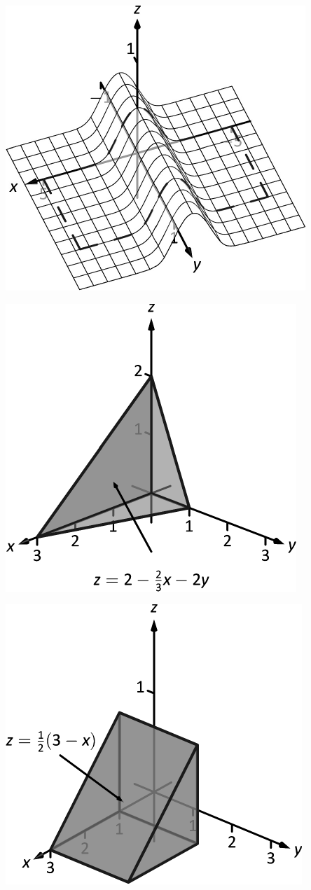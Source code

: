 \documentclass[10pt]{article}
\begin{document}
\includegraphics{fig13_05_ex_08_3DBW.pdf}
\texttt{}

\includegraphics{fig13_06_ex_07_3DBW.pdf}
\texttt{}

\includegraphics{fig13_06_ex_08_3DBW.pdf}
\texttt{}
\end{document}
